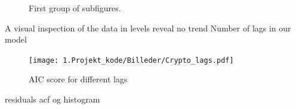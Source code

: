 \begin{figure}[!ht]
  \caption{First group of subfigures.}
  \label{fig:sub1}
\end{figure}
A visual inspection of the data in levels reveal no trend
\newpage
Number of lags in our model
\begin{figure}
    \centering
    \texttt{[image: 1.Projekt\_kode/Billeder/Crypto\_lags.pdf]}
    \caption{AIC score for different lags}
    \label{fig:enter-label}
\end{figure}

residuals acf og histogram


